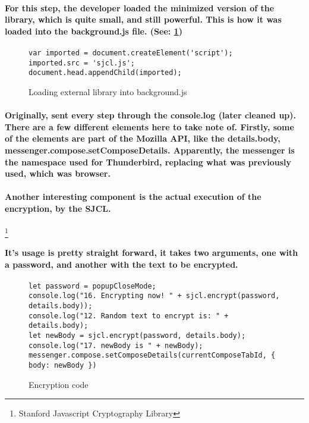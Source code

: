 \paragraph{For this step, the developer loaded the minimized version of the library, which is quite small, and still powerful. This is how it was loaded into the background.js file. (See: \ref{fig: loadSJCL})}


\begin{figure}[H]
\centering
\begin{verbatim}
var imported = document.createElement('script');
imported.src = 'sjcl.js';
document.head.appendChild(imported);
\end{verbatim}
\caption{\label{fig: loadSJCL} Loading external library into background.js}
\end{figure}

\paragraph{Originally, sent every step through the console.log (later cleaned up). There are a few different elements here to take note of. Firstly, some of the elements are part of the Mozilla API, like the details.body, messenger.compose.setComposeDetails. Apparently, the messenger is the namespace used for Thunderbird, replacing what was previously used, which was browser.}

\paragraph{Another interesting component is the actual execution of the encryption, by the SJCL.}\footnote{Stanford Javascript Cryptography Library}

\paragraph{It's usage is pretty straight forward, it takes two arguments, one with a password, and another with the text to be encrypted.}


\begin{figure}[H]
\centering
\begin{verbatim}
let password = popupCloseMode;
console.log("16. Encrypting now! " + sjcl.encrypt(password, details.body));
console.log("12. Random text to encrypt is: " + details.body);
let newBody = sjcl.encrypt(password, details.body);
console.log("17. newBody is " + newBody);
messenger.compose.setComposeDetails(currentComposeTabId, { body: newBody })
\end{verbatim}
\caption{\label{fig: encryptionCode} Encryption code}
\end{figure}

